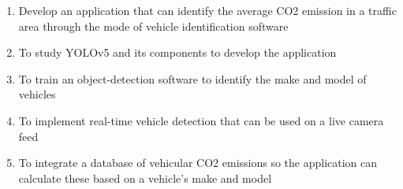 \begin{comment}
How to formulate your research objectives:
1. Identify what research steps do you need to perform to achieve your general objective.
2. Identify the questions that must be answered for you to achieve your general objective.
    Thereafter, convert these questions into action statements

Example #1:

Research Question:
  What are the general features of a web-based learning environment?

Specific Objective:
   To review existing web-based learning environment that teaches language learning for children


Example #2:

Research Question:
   How will you represent commonsense knowledge for use by computer systems?

Specific Objective:
   To identify knowledge representation approaches used by existing story generation systems

Example #3:
Research Question:
   What types of storytelling knowledge are needed to generate stories?

Specific Objective:
    To identify the different types of storytelling knowledge used in generating stories

Example #4:
Research Question:
    What machine learning approaches will you utilize?

Specific Objective:
    To determine existing machine learning algorithms [that can be used in training the computer system to detect cyberbullying cases] 

Example #5: Research Question:
    How will your research output be evaluated?

Specific Objective:
    To define evaluation metrics for validating the accuracy of the translation

\end{comment}

%
%

\begin{enumerate}
   \item Develop an application that can identify the average CO2 emission in a traffic area through the mode of vehicle identification software
   \item To study YOLOv5 and its components to develop the application
   \item To train an object-detection software to identify the make and model of vehicles
   \item To implement real-time vehicle detection that can be used on a live camera feed
   \item To integrate a database of vehicular CO2 emissions so the application can calculate these based on a vehicle’s make and model

\end{enumerate}


